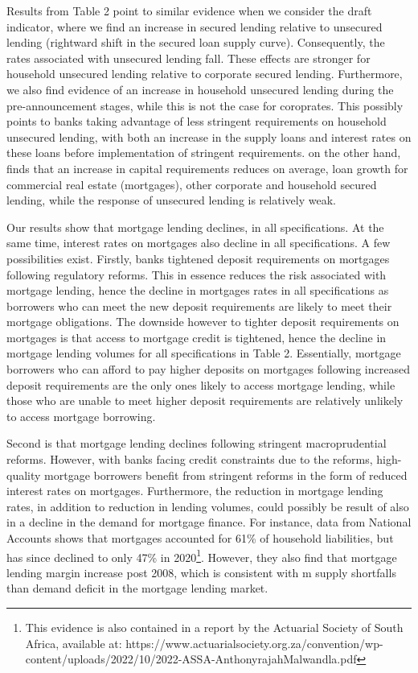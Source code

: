 \documentclass[
  letterpaper,
  DIV=11,
  numbers=noendperiod]{scrartcl}
\begin{document}
Results from Table 2 point to similar evidence when we consider the
draft indicator, where we find an increase in secured lending relative
to unsecured lending (rightward shift in the secured loan supply curve).
Consequently, the rates associated with unsecured lending fall. These
effects are stronger for household unsecured lending relative to
corporate secured lending. Furthermore, we also find evidence of an
increase in household unsecured lending during the pre-announcement
stages, while this is not the case for coroprates. This possibly points
to banks taking advantage of less stringent requirements on household
unsecured lending, with both an increase in the supply loans and
interest rates on these loans before implementation of stringent
requirements. \cite{bridges2014impact} on the other hand, finds that an
increase in capital requirements reduces on average, loan growth for
commercial real estate (mortgages), other corporate and household
secured lending, while the response of unsecured lending is relatively
weak.

Our results show that mortgage lending declines, in all specifications.
At the same time, interest rates on mortgages also decline in all
specifications. A few possibilities exist. Firstly, banks tightened
deposit requirements on mortgages following regulatory reforms. This in
essence reduces the risk associated with mortgage lending, hence the
decline in mortgages rates in all specifications as borrowers who can
meet the new deposit requirements are likely to meet their mortgage
obligations. The downside however to tighter deposit requirements on
mortgages is that access to mortgage credit is tightened, hence the
decline in mortgage lending volumes for all specifications in Table 2.
Essentially, mortgage borrowers who can afford to pay higher deposits on
mortgages following increased deposit requirements are the only ones
likely to access mortgage lending, while those who are unable to meet
higher deposit requirements are relatively unlikely to access mortgage
borrowing.

Second is that mortgage lending declines following stringent
macroprudential reforms. However, with banks facing credit constraints
due to the reforms, high-quality mortgage borrowers benefit from
stringent reforms in the form of reduced interest rates on mortgages.
Furthermore, the reduction in mortgage lending rates, in addition to
reduction in lending volumes, could possibly be result of also in a
decline in the demand for mortgage finance. For instance, data from
National Accounts shows that mortgages accounted for 61\% of household
liabilities, but has since declined to only 47\% in
2020\footnote{This evidence is also contained in a report by the Actuarial Society of South Africa, available at: https://www.actuarialsociety.org.za/convention/wp-content/uploads/2022/10/2022-ASSA-AnthonyrajahMalwandla.pdf}.
However, they also find that mortgage lending margin increase post 2008,
which is consistent with m supply shortfalls than demand deficit in the
mortgage lending market.
\end{document}
